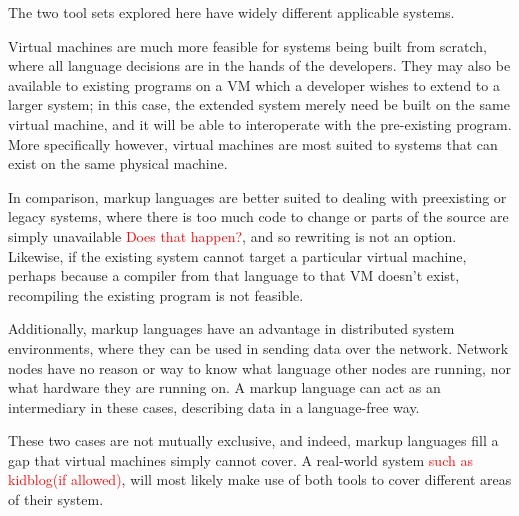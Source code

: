 \documentclass{sig-alternate}
\newcommand{\mycomment}[1]{\textcolor{red}{#1}}
\begin{document}
The two tool sets explored here have widely different applicable systems. 

Virtual machines are much more feasible for systems being built from scratch, where all language decisions are in the hands of the developers. They may also be available to existing programs on a VM which a developer wishes to extend to a larger system; in this case, the extended system merely need be built on the same virtual machine, and it will be able to interoperate with the pre-existing program. More specifically however, virtual machines are most suited to systems that can exist on the same physical machine.

In comparison, markup languages are better suited to dealing with preexisting or legacy systems, where there is too much code to change or parts of the source are simply unavailable \mycomment{Does that happen?},
and so rewriting is not an option. Likewise, if the existing system cannot target a particular virtual machine, perhaps because a compiler from that language to that VM doesn't exist, recompiling the existing program is not feasible.

Additionally, markup languages have an advantage in distributed system environments, where they can be used in sending data over the network. Network nodes have no reason or way to know what language other nodes are running, nor what hardware they are running on. A markup language can act as an intermediary in these cases, describing data in a language-free way.

These two cases are not mutually exclusive, and indeed, markup languages fill a gap that virtual machines simply cannot cover. A real-world system \mycomment{such as kidblog(if allowed)}, will most likely make use of both tools to cover different areas of their system.





  
\end{document}
